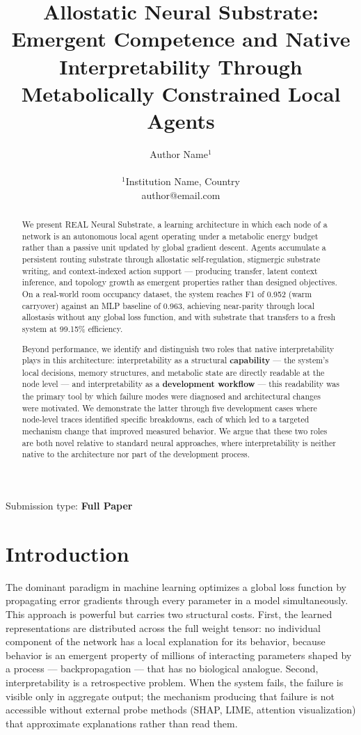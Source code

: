 \documentclass[letterpaper]{article}
\title{Allostatic Neural Substrate: Emergent Competence and Native Interpretability Through Metabolically Constrained Local Agents}
\author{
    Author Name$^{1}$ \\
    \mbox{}\\
    $^1$Institution Name, Country \\
    author@email.com
}
\begin{document}
\maketitle

\begin{abstract}
    We present REAL Neural Substrate, a learning architecture in which each node of a network is an autonomous local agent operating under a metabolic energy budget rather than a passive unit updated by global gradient descent. Agents accumulate a persistent routing substrate through allostatic self-regulation, stigmergic substrate writing, and context-indexed action support — producing transfer, latent context inference, and topology growth as emergent properties rather than designed objectives. On a real-world room occupancy dataset, the system reaches F1 of 0.952 (warm carryover) against an MLP baseline of 0.963, achieving near-parity through local allostasis without any global loss function, and with substrate that transfers to a fresh system at 99.15\% efficiency.

    Beyond performance, we identify and distinguish two roles that native interpretability plays in this architecture: interpretability as a structural \textbf{capability} — the system's local decisions, memory structures, and metabolic state are directly readable at the node level — and interpretability as a \textbf{development workflow} — this readability was the primary tool by which failure modes were diagnosed and architectural changes were motivated. We demonstrate the latter through five development cases where node-level traces identified specific breakdowns, each of which led to a targeted mechanism change that improved measured behavior. We argue that these two roles are both novel relative to standard neural approaches, where interpretability is neither native to the architecture nor part of the development process.
\end{abstract}

Submission type: \textbf{Full Paper}\\

\section{Introduction}

The dominant paradigm in machine learning optimizes a global loss function by propagating error gradients through every parameter in a model simultaneously. This approach is powerful but carries two structural costs. First, the learned representations are distributed across the full weight tensor: no individual component of the network has a local explanation for its behavior, because behavior is an emergent property of millions of interacting parameters shaped by a process — backpropagation — that has no biological analogue. Second, interpretability is a retrospective problem. When the system fails, the failure is visible only in aggregate output; the mechanism producing that failure is not accessible without external probe methods (SHAP, LIME, attention visualization) that approximate explanations rather than read them.
\end{document}
